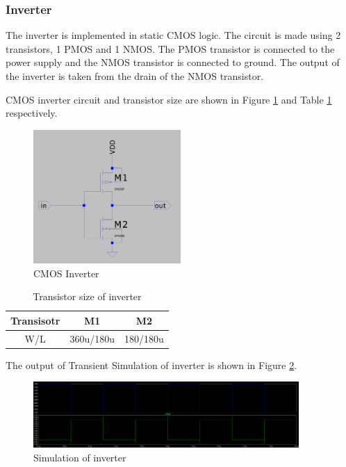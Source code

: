 \subsubsection{Inverter}
The inverter is implemented in static CMOS logic. The circuit is made using 2 transistors, 1 PMOS and 1 NMOS. The PMOS transistor is connected to the power supply and the NMOS transistor is connected to ground. The output of the inverter is taken from the drain of the NMOS transistor.

CMOS inverter circuit and transistor size are shown in Figure \ref{fig:inverter} and Table \ref{tab:inverter_size} respectively.
\begin{figure}[h]
	\centering
	\includegraphics[width=0.5\textwidth]{figs/inverter_circuit.png}
	\caption{CMOS Inverter}
	\label{fig:inverter}
	\vspace{0.5cm}
\end{figure}
\begin{table}[H]
\centering
\begin{tabular}{|c|c|c|}
\hline
Transisotr & M1 & M2 \\
\hline
W/L & 360u/180u & 180/180u \\
\hline
\end{tabular}
\caption{Transistor size of inverter}
\label{tab:inverter_size}
\vspace{0.5cm}
\end{table}
The output of Transient Simulation of inverter is shown in Figure \ref{fig:inverter_output}.
\begin{figure}[H]
	\centering
	\includegraphics[width=0.9\textwidth]{figs/inverterop.png}
	\caption{Simulation of inverter}
	\label{fig:inverter_output}
	\vspace{0.5cm}
\end{figure}

